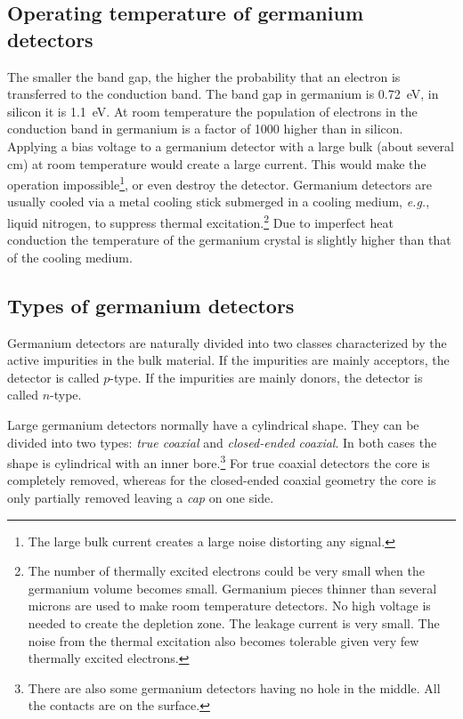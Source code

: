 \subsection{Operating temperature of germanium detectors}
\label{sec:det:temp}
The smaller the band gap, the higher the probability that an electron is transferred to the conduction band. The band gap in germanium is 0.72~eV, in silicon it is 1.1~eV. At room temperature the population of electrons in the conduction band in germanium is a factor of 1000 higher than in silicon. Applying a bias voltage to a germanium detector with a large bulk (about several cm) at room temperature would create a large current. This would make the operation impossible\footnote{The large bulk current creates a large noise distorting any signal.}, or even destroy the detector. Germanium detectors are usually cooled via a metal cooling stick submerged in a cooling medium, \textit{e.g.}, liquid nitrogen, to suppress thermal excitation.\footnote{The number of thermally excited electrons could be very small when the germanium volume becomes small. Germanium pieces thinner than several microns are used to make room temperature detectors. No high voltage is needed to create the depletion zone. The leakage current is very small. The noise from the thermal excitation also becomes tolerable given very few thermally excited electrons.} Due to imperfect heat conduction the temperature of the germanium crystal is slightly higher than that of the cooling medium.

\subsection{Types of germanium detectors}
\label{sec:det:type}
Germanium detectors are naturally divided into two classes characterized by the active impurities in the bulk material. If the impurities are mainly acceptors, the detector is called $p$-type. If the impurities are mainly donors, the detector is called $n$-type. 

Large germanium detectors normally have a cylindrical shape. They can be divided into two types: \textit{true coaxial} and \textit{closed-ended coaxial}. In both cases the shape is cylindrical with an inner bore.\footnote{There are also some germanium detectors having no hole in the middle. All the contacts are on the surface.} For true coaxial detectors the core is completely removed, whereas for the closed-ended coaxial geometry the core is only partially removed leaving a \textit{cap} on one side.

